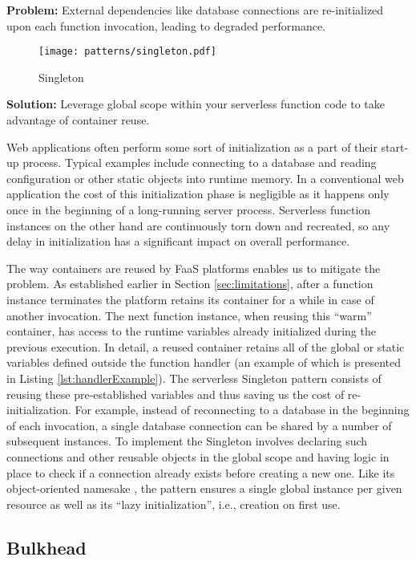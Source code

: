 \textbf{Problem:} External dependencies like database connections are re-initialized upon each function invocation, leading to degraded performance.

\begin{figure}[h]
  \centering
  \texttt{[image: patterns/singleton.pdf]}
  \caption{Singleton}
  \label{fig:singleton}
\end{figure}

\textbf{Solution:} Leverage global scope within your serverless function code to take advantage of container reuse.

Web applications often perform some sort of initialization as a part of their start-up process. Typical examples include connecting to a database and reading configuration or other static objects into runtime memory. In a conventional web application the cost of this initialization phase is negligible as it happens only once in the beginning of a long-running server process. Serverless function instances on the other hand are continuously torn down and recreated, so any delay in initialization has a significant impact on overall performance.

The way containers are reused by FaaS platforms enables us to mitigate the problem. As established earlier in Section \ref{sec:limitations}, after a function instance terminates the platform retains its container for a while in case of another invocation. The next function instance, when reusing this ``warm'' container, has access to the runtime variables already initialized during the previous execution. In detail, a reused container retains all of the global or static variables defined outside the function handler (an example of which is presented in Listing \ref{lst:handlerExample}). The serverless Singleton pattern consists of reusing these pre-established variables and thus saving us the cost of re-initialization. For example, instead of reconnecting to a database in the beginning of each invocation, a single database connection can be shared by a number of subsequent instances. To implement the Singleton involves declaring such connections and other reusable objects in the global scope and having logic in place to check if a connection already exists before creating a new one. Like its object-oriented namesake \parencite{gamma94designPatterns}, the pattern ensures a single global instance per given resource as well as its ``lazy initialization'', i.e., creation on first use. \parencite{aws18serverlessLens}

\subsection{Bulkhead} \label{subsec:Bulkhead}

